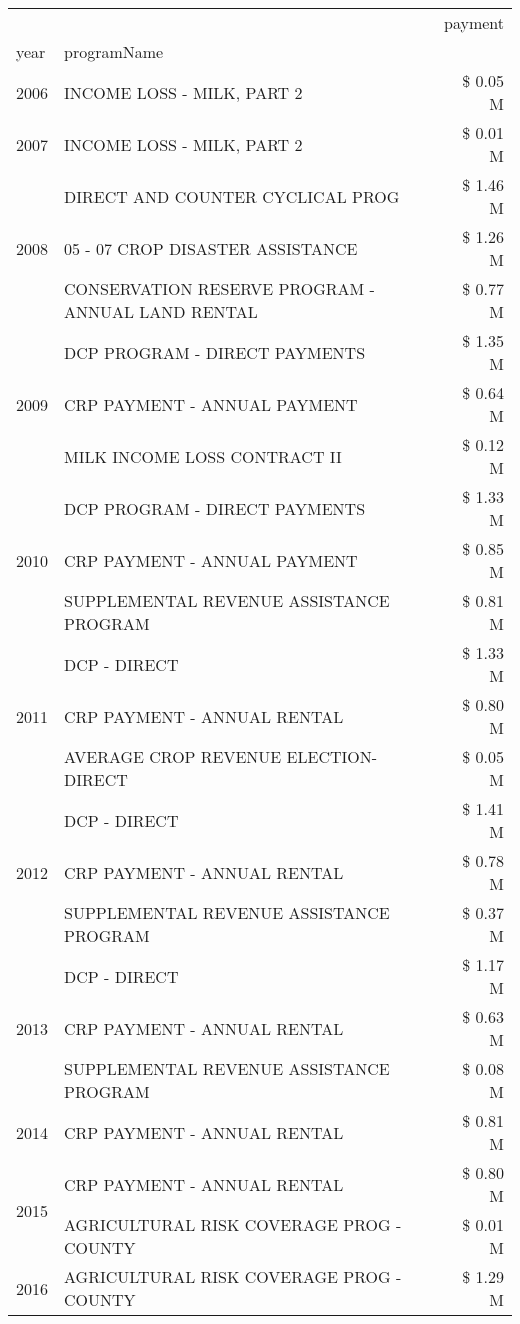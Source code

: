 \begin{tabular}{llr}
\toprule
 &  & payment \\
year & programName &  \\
\midrule
2006 & INCOME LOSS - MILK, PART 2 & \$ 0.05 M \\
\cline{1-3}
2007 & INCOME LOSS - MILK, PART 2 & \$ 0.01 M \\
\cline{1-3}
\multirow[t]{3}{*}{2008} & DIRECT AND COUNTER CYCLICAL PROG & \$ 1.46 M \\
 & 05 - 07 CROP DISASTER ASSISTANCE & \$ 1.26 M \\
 & CONSERVATION RESERVE PROGRAM - ANNUAL LAND RENTAL & \$ 0.77 M \\
\cline{1-3}
\multirow[t]{3}{*}{2009} & DCP PROGRAM - DIRECT PAYMENTS & \$ 1.35 M \\
 & CRP PAYMENT - ANNUAL PAYMENT & \$ 0.64 M \\
 & MILK INCOME LOSS CONTRACT II & \$ 0.12 M \\
\cline{1-3}
\multirow[t]{3}{*}{2010} & DCP PROGRAM - DIRECT PAYMENTS & \$ 1.33 M \\
 & CRP PAYMENT - ANNUAL PAYMENT & \$ 0.85 M \\
 & SUPPLEMENTAL REVENUE ASSISTANCE PROGRAM & \$ 0.81 M \\
\cline{1-3}
\multirow[t]{3}{*}{2011} & DCP - DIRECT & \$ 1.33 M \\
 & CRP PAYMENT - ANNUAL RENTAL & \$ 0.80 M \\
 & AVERAGE CROP REVENUE ELECTION-DIRECT & \$ 0.05 M \\
\cline{1-3}
\multirow[t]{3}{*}{2012} & DCP - DIRECT & \$ 1.41 M \\
 & CRP PAYMENT - ANNUAL RENTAL & \$ 0.78 M \\
 & SUPPLEMENTAL REVENUE ASSISTANCE PROGRAM & \$ 0.37 M \\
\cline{1-3}
\multirow[t]{3}{*}{2013} & DCP - DIRECT & \$ 1.17 M \\
 & CRP PAYMENT - ANNUAL RENTAL & \$ 0.63 M \\
 & SUPPLEMENTAL REVENUE ASSISTANCE PROGRAM & \$ 0.08 M \\
\cline{1-3}
2014 & CRP PAYMENT - ANNUAL RENTAL & \$ 0.81 M \\
\cline{1-3}
\multirow[t]{2}{*}{2015} & CRP PAYMENT - ANNUAL RENTAL & \$ 0.80 M \\
 & AGRICULTURAL RISK COVERAGE PROG - COUNTY & \$ 0.01 M \\
\cline{1-3}
\multirow[t]{3}{*}{2016} & AGRICULTURAL RISK COVERAGE PROG - COUNTY & \$ 1.29 M \\

\end{tabular}
